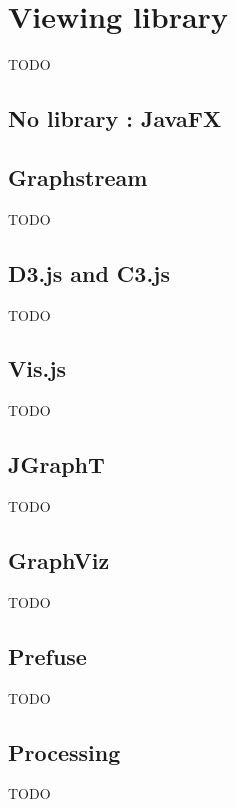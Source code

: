 \chapter{Viewing library} %
\label{cha:Viewing library}

TODO

\section{No library : JavaFX} %
\label{sec:No library : JavaFX}


\section{Graphstream} %
\label{sec:Graphstream}

TODO



\section{D3.js and C3.js} %
\label{sec:D3.js and C3.js}

TODO



\section{Vis.js} %
\label{sec:Vis.js}

TODO



\section{JGraphT} %
\label{sec:JGraphT}

TODO



\section{GraphViz} %
\label{sec:GraphViz}

TODO



\section{Prefuse} %
\label{sec:Prefuse}

TODO



\section{Processing} %
\label{sec:Processing}

TODO




